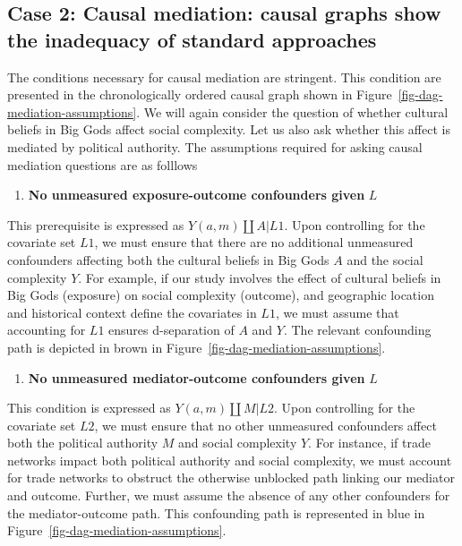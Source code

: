 \documentclass[
  singlecolumn]{report}
\providecommand{\tightlist}{%
  \setlength{\itemsep}{0pt}\setlength{\parskip}{0pt}}\usepackage{longtable,booktabs,array}
\begin{document}
\hypertarget{case-2-causal-mediation-causal-graphs-show-the-inadequacy-of-standard-approaches}{%
\subsection{Case 2: Causal mediation: causal graphs show the inadequacy
of standard
approaches}\label{case-2-causal-mediation-causal-graphs-show-the-inadequacy-of-standard-approaches}}

The conditions necessary for causal mediation are stringent. This
condition are presented in the chronologically ordered causal graph
shown in Figure~\ref{fig-dag-mediation-assumptions}. We will again
consider the question of whether cultural beliefs in Big Gods affect
social complexity. Let us also ask whether this affect is mediated by
political authority. The assumptions required for asking causal
mediation questions are as folllows

\begin{enumerate}
\def\labelenumi{\arabic{enumi}.}
\tightlist
\item
  \textbf{No unmeasured exposure-outcome confounders given} \(L\)
\end{enumerate}

This prerequisite is expressed as \(Y(a,m) \coprod A | L1\). Upon
controlling for the covariate set \(L1\), we must ensure that there are
no additional unmeasured confounders affecting both the cultural beliefs
in Big Gods \(A\) and the social complexity \(Y\). For example, if our
study involves the effect of cultural beliefs in Big Gods (exposure) on
social complexity (outcome), and geographic location and historical
context define the covariates in \(L1\), we must assume that accounting
for \(L1\) ensures d-separation of \(A\) and \(Y\). The relevant
confounding path is depicted in brown in
Figure~\ref{fig-dag-mediation-assumptions}.

\begin{enumerate}
\def\labelenumi{\arabic{enumi}.}
\setcounter{enumi}{1}
\tightlist
\item
  \textbf{No unmeasured mediator-outcome confounders given} \(L\)
\end{enumerate}

This condition is expressed as \(Y(a,m) \coprod M | L2\). Upon
controlling for the covariate set \(L2\), we must ensure that no other
unmeasured confounders affect both the political authority \(M\) and
social complexity \(Y\). For instance, if trade networks impact both
political authority and social complexity, we must account for trade
networks to obstruct the otherwise unblocked path linking our mediator
and outcome. Further, we must assume the absence of any other
confounders for the mediator-outcome path. This confounding path is
represented in blue in Figure~\ref{fig-dag-mediation-assumptions}.
\end{document}
